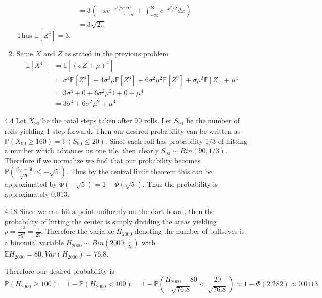 \documentclass[12pt, letterpaper]{article}
\newcommand{\Pro}{\mathbb{P}}
\newcommand{\E}{\mathbb{E}}
\begin{document}
\begin{enumerate}
\begin{enumerate}
\begin{align*}
			&= 3(-xe^{-x^2/2}]_{-\infty}^\infty + \int_{-\infty}^\infty e^{-x^2/2}dx)\\
			&= 3 \sqrt{2 \pi}
		\end{align*}
		Thus $\E[Z^4] = 3$.  
		\item Same $X$ and $Z$ as stated in the previous problem
		\begin{align*}
			\E[X^4] &= \E[(\sigma Z + \mu)^4]\\
			&= \sigma^4\E[Z^4] + 4\sigma^3 \mu \E[Z^3] + 6 \sigma^2 \mu^2 \E[Z^2] + \sigma \mu^3 \E[Z] + \mu^4\\
			&= 3 \sigma^4 + 0 + 6 \sigma^2 \mu^2 1 + 0 + \mu^4\\
			&= 3 \sigma^4+ 6 \sigma^2 \mu^2 + \mu^4
		\end{align*}
	\end{enumerate}
	\item[4.4] Let $X_{90}$ be the total steps taken after 90 rolls.  Let $S_{90}$
	be the number of rolls yielding 1 step forward.  Then our desired probability can be written as $\Pro(X_{90} \geq 160) = \Pro(S_{90} \leq 20)$.  Since each roll has probability $1/3$ of hitting a number which advances us one tile, then 
	clearly $S_{90} \sim Bin(90,1/3)$.  Therefore if we normalize we find that our probability becomes $\Pro(\frac{S_{90} - 30}{\sqrt{20}} \leq - \sqrt{5})$.
	Thus by the central limit theorem this can be approximated by $\Phi(-\sqrt{5}) = 1 - \Phi(\sqrt{5})$.
	Thus the probability is approximately $0.013$.   
	\item[4.18]  Since we can hit a point uniformly on the dart board, then 
	the probability of hitting the center is simply dividing the areas yielding $p =  \frac{\pi 1^2}{\pi 5^2} = \frac{1}{25}$.  Therefore the variable $H_{2000}$ 
	denoting the number of bullseyes is a binomial variable 
	$H_{2000} \sim Bin(2000,\frac{1}{25})$ with $\E H_{2000} = 80, Var(H_{2000}) = 76.8$.  
	
	Therefore our desired probability is $$\Pro(H_{2000} \geq 100) = 1 - \Pro(H_{2000} < 100) = 1 - \Pro(\frac{H_{2000}-80}{\sqrt{76.8}} < \frac{20}{\sqrt{76.8}} ) \approx  1 - \Phi(2.282) \approx 0.0113$$
	

\end{enumerate}
\end{document}
